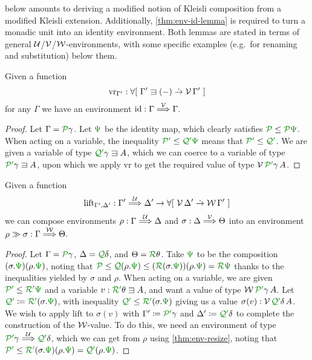  below amounts to deriving a modified notion of Kleisli
composition from a modified Kleisli extension.
Additionally, \cref{thm:env-id-lemma} is required to turn a monadic unit into an
identity environment.
Both lemmas are stated in terms of general $\mathcal U$/$\mathcal V$/$\mathcal W$-environments, with
some specific examples (e.g.\ for renaming and substitution) below them.

\begin{lemma}\label{thm:env-id-lemma}
  Given a function
  \[
    \mathrm{vr}_{\Gamma'} : \forallb{\Gamma' \sqni \plr{-} \dotto \V\,\Gamma'}
  \]
  for any
  $\Gamma$ we have an environment $\mathrm{id} : \Gamma \stackrel{\mathcal V}\Longrightarrow \Gamma$.
\end{lemma}
\begin{proof}
  Let $\Gamma = \grP\gamma$.
  Let $\gr\Psi$ be the identity map, which clearly satisfies
  $\grP \leq \grP\gr\Psi$.
  When acting on a variable, the inequality $\grPprime \leq \grQprime\gr\Psi$
  means that $\grPprime \leq \grQprime$.
  We are given a variable of type $\grQprime\gamma \sqni A$, which we can
  coerce to a variable of type $\grPprime\gamma \sqni A$, upon which we apply
  $\mathrm{vr}$ to get the required value of type $\V\,\grPprime\gamma\,A$.
\end{proof}

\begin{lemma}\label{thm:env-comp-lemma}
  Given a function
  \[
    \mathrm{lift}_{\Gamma', \Delta'} :
    \Gamma' \env\U \Delta' \to \forallb{\V\,\Delta' \dotto \W\,\Gamma'}
  \]
  we can compose environments $\rho : \Gamma \stackrel{\mathcal U}\Longrightarrow \Delta$ and
  $\sigma : \Delta \stackrel{\mathcal V}\Longrightarrow \Theta$ into an environment
  $\rho \gg \sigma : \Gamma \stackrel{\mathcal W}\Longrightarrow \Theta$.
\end{lemma}
\begin{proof}
  Let $\Gamma = \grP\gamma$, $\Delta = \grQ\delta$, and $\Theta = \grR\theta$.
  Take $\gr\Psi$ to be the composition $\plr{\sigma.\gr\Psi}\plr{\rho.\gr\Psi}$,
  noting that
  $\grP \leq \grQ\plr{\rho.\gr\Psi} \leq
  (\grR\plr{\sigma.\gr\Psi})\plr{\rho.\gr\Psi} = \grR\gr\Psi$
  thanks to the inequalities yielded by $\sigma$ and $\rho$.
  When acting on a variable, we are given $\grPprime \leq \grRprime\gr\Psi$ and
  a variable $v : \grRprime\theta \sqni A$, and want a value of type
  $\W\,\grPprime\gamma\,A$.
  Let $\grQprime \coloneqq \grRprime\plr{\sigma.\gr\Psi}$, with inequality
  $\grQprime \leq \grRprime\plr{\sigma.\gr\Psi}$ giving us a value
  $\sigma(v) : \V\,\grQprime\delta\,A$.
  We wish to apply $\mathrm{lift}$ to $\sigma(v)$ with
  $\Gamma' \coloneqq \grPprime\gamma$ and $\Delta' \coloneqq \grQprime\delta$ to
  complete the construction of the $\mathcal W$-value.
  To do this, we need an environment of type
  $\grPprime\gamma \env\U \grQprime\delta$, which we can get from $\rho$ using
  \cref{thm:env-resize}, noting that
  $\grPprime \leq \grRprime\plr{\sigma.\gr\Psi}\plr{\rho.\gr\Psi} =
  \grQprime\plr{\rho.\gr\Psi}$.
\end{proof}

